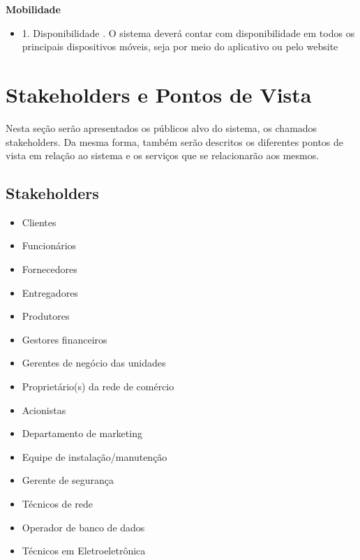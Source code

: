\textbf{Mobilidade}
\begin{itemize}[label={}]
	\item 1. Disponibilidade 
		. O sistema deverá contar com disponibilidade em todos os principais dispositivos móveis, seja por meio do aplicativo ou pelo website 
\end{itemize}

\section{Stakeholders e Pontos de Vista}

Nesta seção serão apresentados os públicos alvo do sistema, os chamados stakeholders. Da mesma forma, também serão descritos os diferentes pontos de vista em relação ao sistema e os serviços que se relacionarão aos mesmos.

\subsection{Stakeholders}
\begin{itemize}
	\item Clientes 
	\item Funcionários
	\item Fornecedores
	\item Entregadores
	\item Produtores
	\item Gestores financeiros
	\item Gerentes de negócio das unidades
	\item Proprietário(s) da rede de comércio
	\item Acionistas
	\item Departamento de marketing
	\item Equipe de instalação/manutenção 
	\item Gerente de segurança
	\item Técnicos de rede
	\item Operador de banco de dados
	\item Técnicos em Eletroeletrônica
\end{itemize}

